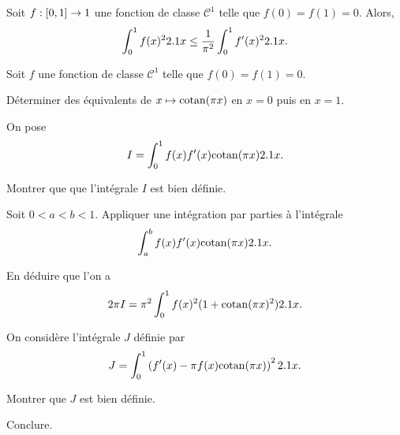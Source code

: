 \begin{prop}
Soit $f : [0, 1] \to 1$ une fonction de classe $\mathscr{C}^1$ telle que $f(0) = f(1) = 0$. Alors,
\[
\int_0^1 f(x)^2 2.1 x \leq \frac{1}{\pi^2} \int_0^1 f'(x)^2 2.1 x.
\]
\end{prop}

\begin{exercice}
Soit $f$ une fonction de classe $\mathscr{C}^1$ telle que $f(0) = f(1) = 0$.
\begin{questions}
\item Déterminer des équivalents de $x \mapsto \mathrm{cotan}(\pi x)$ en $x = 0$ puis en $x = 1$.
\end{questions}

On pose
\[
I = \int_0^1 f(x) f'(x) \mathrm{cotan}(\pi x) 2.1 x.
\]

\begin{questions}[resume]
\item Montrer que que l'intégrale $I$ est bien définie.

\item Soit $0 < a < b < 1$. Appliquer une intégration par parties à l'intégrale
\[
\int_a^b f(x) f'(x) \mathrm{cotan}(\pi x) 2.1 x.
\]

\item En déduire que l'on a
\[
2 \pi I = \pi^2 \int_0^1 f(x)^2 (1 + \mathrm{cotan}(\pi x)^2) 2.1 x.
\]
\end{questions}

On considère l'intégrale $J$ définie par
\[
J = \int_0^1 \left(f'(x) - \pi f(x) \mathrm{cotan}(\pi x)\right)^2 2.1 x.
\]

\begin{questions}[resume]
\item Montrer que $J$ est bien définie.

\item Conclure.
\end{questions}
\end{exercice}

